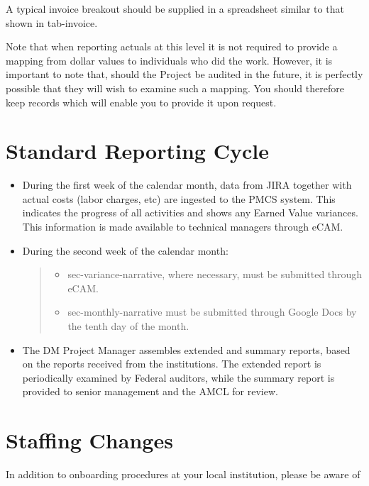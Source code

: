 A typical invoice breakout should be supplied in a spreadsheet similar
to that shown in tab-invoice.

Note that when reporting actuals at this level it is not required to
provide a mapping from dollar values to individuals who did the work.
However, it is important to note that, should the Project be audited in
the future, it is perfectly possible that they will wish to examine such
a mapping. You should therefore keep records which will enable you to
provide it upon request.

\section{Standard Reporting Cycle}\label{standard-reporting-cycle}

\begin{itemize}
\item
  During the first week of the calendar month, data from JIRA together
  with actual costs (labor charges, etc) are ingested to the PMCS
  system. This indicates the progress of all activities and shows any
  Earned Value variances. This information is made available to
  technical managers through eCAM.
\item
  During the second week of the calendar month:

  \begin{quote}
  \begin{itemize}
  \item
    sec-variance-narrative, where necessary, must be submitted through
    eCAM.
  \item
    sec-monthly-narrative must be submitted through Google Docs by the
    tenth day of the month.
  \end{itemize}
  \end{quote}
\item
  The DM Project Manager assembles extended and summary reports, based
  on the reports received from the institutions. The extended report is
  periodically examined by Federal auditors, while the summary report is
  provided to senior management and the AMCL for review.
\end{itemize}

\section{Staffing Changes}\label{staffing-changes}

In addition to onboarding procedures at your local institution, please
be aware of


